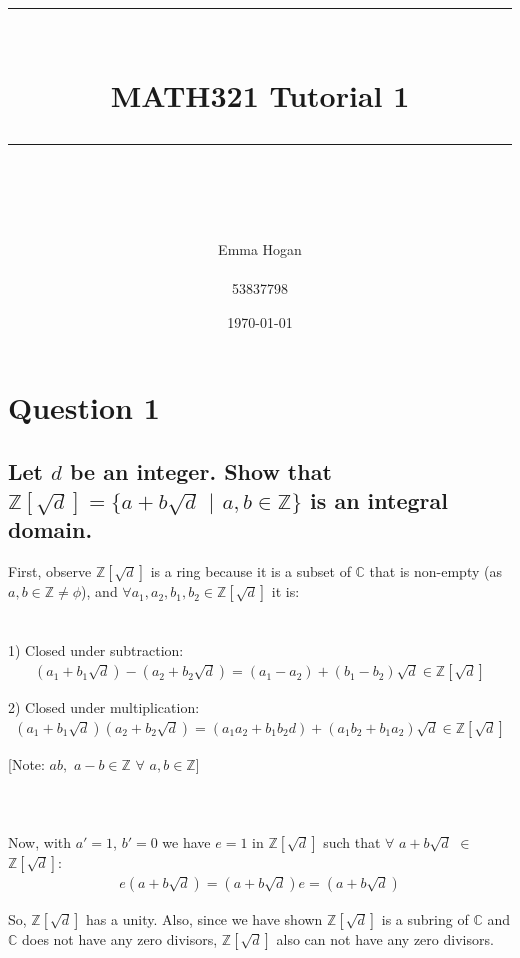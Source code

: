 \documentclass{article}
\title{	
	\normalfont\normalsize
	\vspace{25pt} %
	\rule{\linewidth}{0.5pt}\\ %
	\vspace{20pt} %
	{\huge MATH321 Tutorial 1}\\ %
	\vspace{12pt} %
	\rule{\linewidth}{2pt}\\ %
	\vspace{12pt} %
}
\author{\LARGE Emma Hogan \\\\53837798} %
\date{\normalsize\today} %
\begin{document}
\begin{titlepage}
\maketitle
\thispagestyle{empty}
\end{titlepage}
\section*{Question 1}
\subsection*{Let \(d\) be an integer. Show that \(\mathds{Z}[\sqrt{d}] = \{a + b\sqrt{d}\) \(|\) \(a,b \in \mathds{Z}\}\) is an integral domain.}

\solution
First, observe \(\mathds{Z}[\sqrt{d}]\) is a ring because it is a subset of \(\mathds{C}\) that is non-empty (as \(a, b \in \mathds{Z} \neq \phi\)), and \(\forall a_1, a_2, b_1, b_2 \in \mathds{Z}[\sqrt{d}]\) it is:
\\\\\\
	\hspace*{8mm} 1) Closed under subtraction:
\begin{align*}
  (a_1 + b_1\sqrt{d}) - (a_2 + b_2\sqrt{d}) = (a_1 - a_2) + (b_1 - b_2)\sqrt{d} \in \mathds{Z}[\sqrt{d}]
\end{align*}	

	\hspace*{8mm} 2) Closed under multiplication:
\begin{align*}
	(a_1 + b_1\sqrt{d})(a_2 + b_2\sqrt{d}) = (a_1 a_2 + b_1 b_2 d) + (a_1 b_2 + b_1 a_2)\sqrt{d} \in \mathds{Z}[\sqrt{d}]
\end{align*}


[Note: \(ab,\) \(a-b \in \mathds{Z}\) \(\forall\) \(a, b \in \mathds{Z}\)]
\\\\\\\\
Now, with \(a'=1\), \(b'=0\) we have \(e = 1\) in \(\mathds{Z}[\sqrt{d}]\) such that \(\forall\) \(a+b\sqrt{d}\) \(\in\) \(\mathds{Z}[\sqrt{d}]\):
\begin{align*}
	e(a+b\sqrt{d}) = (a+b\sqrt{d})e = (a+b\sqrt{d})
\end{align*}

So, \(\mathds{Z}[\sqrt{d}]\) has a unity. Also, since we have shown \(\mathds{Z}[\sqrt{d}]\) is a subring of \(\mathds{C}\) and \(\mathds{C}\) does not have any zero divisors, \(\mathds{Z}[\sqrt{d}]\) also can not have any zero divisors.
\end{document}
